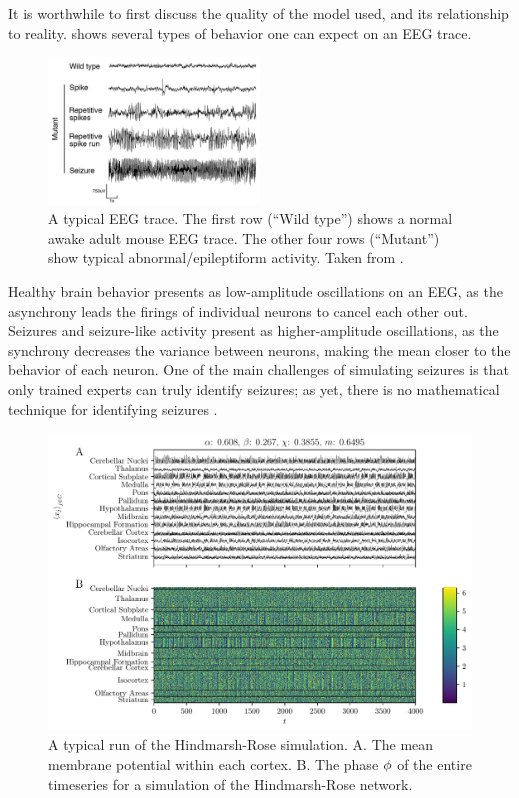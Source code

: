 It is worthwhile to first discuss the quality of the model used, and its relationship to reality.
 shows several types of behavior one can expect on an EEG trace.
\begin{figure}[ht]
  \centering
  \includegraphics[width=0.5\textwidth]{figure/eeg.pdf}
  \caption[Typical EEG trace]{A typical EEG trace.
    The first row (``Wild type'') shows a normal awake adult mouse EEG trace.
    The other four rows (``Mutant'') show typical abnormal/epileptiform activity.
    Taken from \cite{Ljungberg2009}.
  }
  \label{fig:eeg}
\end{figure}
Healthy brain behavior presents as low-amplitude oscillations on an EEG, as the asynchrony leads the firings of individual neurons to cancel each other out.
Seizures and seizure-like activity present as higher-amplitude oscillations, as the synchrony decreases the variance between neurons, making the mean closer to the behavior of each neuron.
One of the main challenges of simulating seizures is that only trained experts can truly identify seizures; as yet, there is no mathematical technique for identifying seizures \cite{Kandel2013}.

\begin{figure}[ht]
  \centering
  \includegraphics[width=\textwidth]{figure/0_608-0_267_200dpi.pdf}
  \caption[Typical simulation]{A typical run of the Hindmarsh-Rose simulation.
    A. The mean membrane potential within each cortex.
    B. The phase $\phi$ of the entire timeseries for a simulation of the Hindmarsh-Rose network.
  }
  \label{fig:608_267}
\end{figure}

